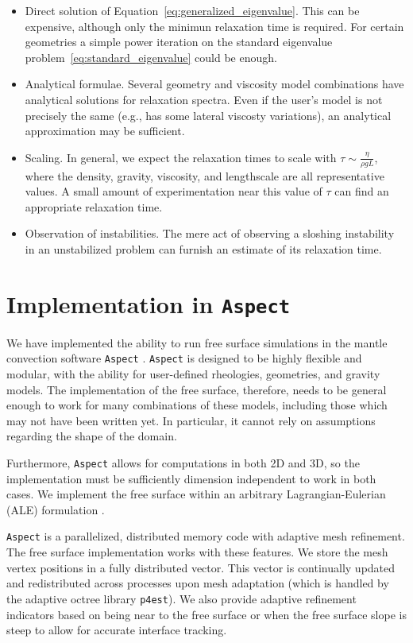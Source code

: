 \documentclass[preprint,12pt,authoryear]{elsarticle}
\begin{document}
\begin{itemize}
\item Direct solution of Equation~\eqref{eq:generalized_eigenvalue}. This can be expensive, although
only the minimun relaxation time is required. For certain geometries a simple power iteration on 
the standard eigenvalue problem~\eqref{eq:standard_eigenvalue} could be enough.
\item Analytical formulae. Several geometry and viscosity model combinations have analytical solutions
for relaxation spectra. Even if the user's model is not precisely the same (e.g., has some lateral viscosty
variations), an analytical approximation may be sufficient.
\item Scaling. In general, we expect the relaxation times to scale with $\tau \sim \frac{\eta}{\rho g L}$,
where the density, gravity, viscosity, and lengthscale are all representative values.  A small amount
of experimentation near this value of $\tau$ can find an appropriate relaxation time.
\item Observation of instabilities.  The mere act of observing a sloshing instability in an unstabilized
problem can furnish an estimate of its relaxation time.
\end{itemize} 


\section{Implementation in \texttt{Aspect} }
\label{sec:implementation}
We have implemented the ability to run free surface simulations in the mantle convection software \texttt{Aspect} \citep{kronbichler2012high}. 
\texttt{Aspect} is designed to be highly flexible and modular, with the ability for user-defined rheologies, geometries, and gravity models. 
The implementation of the free surface, therefore, needs to be general enough to work for many combinations of these models, including those 
which may not have been written yet. In particular, it cannot rely on assumptions regarding the shape of the domain.

Furthermore, \texttt{Aspect} allows for computations in both 2D and 3D, so the implementation must be sufficiently dimension
independent to work in both cases. We implement the free surface within an arbitrary Lagrangian-Eulerian (ALE) formulation
\citep[e.g][]{fullsack1995arbitrary,donea2004encyclopedia}.

\texttt{Aspect} is a parallelized, distributed memory code with adaptive mesh refinement.
The free surface implementation works with these features.  We store the mesh vertex positions 
in a fully distributed vector. This vector is continually updated and redistributed across 
processes upon mesh adaptation (which is handled by the adaptive octree library \texttt{p4est}).
We also provide adaptive refinement indicators based on being near to the free surface or 
when the free surface slope is steep to allow for accurate interface tracking.
\end{document}
